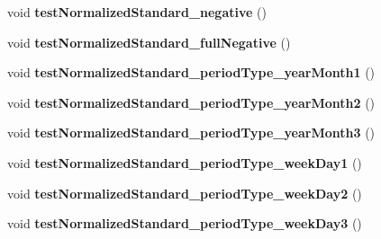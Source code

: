 \begin{DoxyCompactItemize}
\item 
\hypertarget{classorg_1_1joda_1_1time_1_1_test_period___basics_a8013bd22c672dfdd78f6eb29909fb1fd}{void {\bfseries test\-Normalized\-Standard\-\_\-negative} ()}\label{classorg_1_1joda_1_1time_1_1_test_period___basics_a8013bd22c672dfdd78f6eb29909fb1fd}

\item 
\hypertarget{classorg_1_1joda_1_1time_1_1_test_period___basics_ac82198a3ee9aefd9cb57c6feed9e4230}{void {\bfseries test\-Normalized\-Standard\-\_\-full\-Negative} ()}\label{classorg_1_1joda_1_1time_1_1_test_period___basics_ac82198a3ee9aefd9cb57c6feed9e4230}

\item 
\hypertarget{classorg_1_1joda_1_1time_1_1_test_period___basics_a92bc406130f02ec5707e8553cfe60cd5}{void {\bfseries test\-Normalized\-Standard\-\_\-period\-Type\-\_\-year\-Month1} ()}\label{classorg_1_1joda_1_1time_1_1_test_period___basics_a92bc406130f02ec5707e8553cfe60cd5}

\item 
\hypertarget{classorg_1_1joda_1_1time_1_1_test_period___basics_a92c65d7770282888aa09c618117fccdd}{void {\bfseries test\-Normalized\-Standard\-\_\-period\-Type\-\_\-year\-Month2} ()}\label{classorg_1_1joda_1_1time_1_1_test_period___basics_a92c65d7770282888aa09c618117fccdd}

\item 
\hypertarget{classorg_1_1joda_1_1time_1_1_test_period___basics_a913e02f9ba78e493c8f3ba86bac409b4}{void {\bfseries test\-Normalized\-Standard\-\_\-period\-Type\-\_\-year\-Month3} ()}\label{classorg_1_1joda_1_1time_1_1_test_period___basics_a913e02f9ba78e493c8f3ba86bac409b4}

\item 
\hypertarget{classorg_1_1joda_1_1time_1_1_test_period___basics_a7c0c0984f65d3c073d80a725779ef8c6}{void {\bfseries test\-Normalized\-Standard\-\_\-period\-Type\-\_\-week\-Day1} ()}\label{classorg_1_1joda_1_1time_1_1_test_period___basics_a7c0c0984f65d3c073d80a725779ef8c6}

\item 
\hypertarget{classorg_1_1joda_1_1time_1_1_test_period___basics_abf595bcd6709cdc1a1cc5db4d5eab3a2}{void {\bfseries test\-Normalized\-Standard\-\_\-period\-Type\-\_\-week\-Day2} ()}\label{classorg_1_1joda_1_1time_1_1_test_period___basics_abf595bcd6709cdc1a1cc5db4d5eab3a2}

\item 
\hypertarget{classorg_1_1joda_1_1time_1_1_test_period___basics_a88b57bbd200bb981572e840408b9c50f}{void {\bfseries test\-Normalized\-Standard\-\_\-period\-Type\-\_\-week\-Day3} ()}\label{classorg_1_1joda_1_1time_1_1_test_period___basics_a88b57bbd200bb981572e840408b9c50f}


\end{DoxyCompactItemize}
